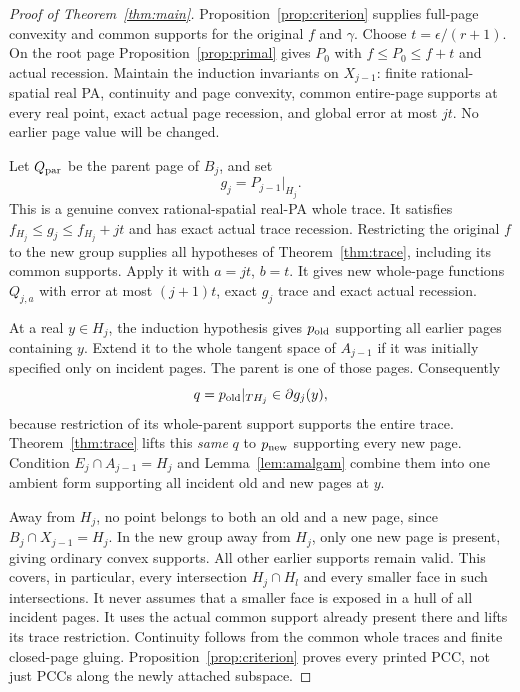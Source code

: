 \documentclass[11pt]{article}
\begin{document}
\begin{proof}[Proof of Theorem~\ref{thm:main}]
Proposition~\ref{prop:criterion} supplies full-page convexity and common supports for the original $f$ and $\gamma$. Choose $t=\epsilon/(r+1)$. On the root page Proposition~\ref{prop:primal} gives $P_0$ with $f\leq P_0\leq f+t$ and actual recession. Maintain the induction invariants on $X_{j-1}$: finite rational-spatial real PA, continuity and page convexity, common entire-page supports at every real point, exact actual page recession, and global error at most $jt$. No earlier page value will be changed.

Let $Q_{\rm par}$ be the parent page of $B_j$, and set
\[
g_j=P_{j-1}|_{H_j}.
\]
This is a genuine convex rational-spatial real-PA whole trace. It satisfies $f_{H_j}\leq g_j\leq f_{H_j}+jt$ and has exact actual trace recession. Restricting the original $f$ to the new group supplies all hypotheses of Theorem~\ref{thm:trace}, including its common supports. Apply it with $a=jt$, $b=t$. It gives new whole-page functions $Q_{j,a}$ with error at most $(j+1)t$, exact $g_j$ trace and exact actual recession.

At a real $y\in H_j$, the induction hypothesis gives $p_{\rm old}$ supporting all earlier pages containing $y$. Extend it to the whole tangent space of $A_{j-1}$ if it was initially specified only on incident pages. The parent is one of those pages. Consequently
\[
q=p_{\rm old}|_{T H_j}\in\partial g_j(y),
\]
because restriction of its whole-parent support supports the entire trace. Theorem~\ref{thm:trace} lifts this \emph{same} $q$ to $p_{\rm new}$ supporting every new page. Condition $E_j\cap A_{j-1}=H_j$ and Lemma~\ref{lem:amalgam} combine them into one ambient form supporting all incident old and new pages at $y$.

Away from $H_j$, no point belongs to both an old and a new page, since $B_j\cap X_{j-1}=H_j$. In the new group away from $H_j$, only one new page is present, giving ordinary convex supports. All other earlier supports remain valid. This covers, in particular, every intersection $H_j\cap H_l$ and every smaller face in such intersections. It never assumes that a smaller face is exposed in a hull of all incident pages. It uses the actual common support already present there and lifts its trace restriction. Continuity follows from the common whole traces and finite closed-page gluing. Proposition~\ref{prop:criterion} proves every printed PCC, not just PCCs along the newly attached subspace.


\end{proof}
\end{document}
